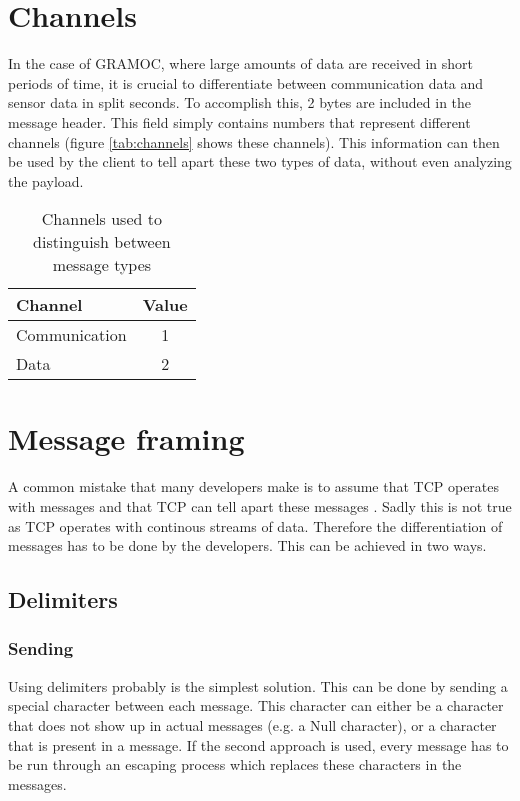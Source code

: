 \section{Channels}
\label{sec:channels}

In the case of GRAMOC, where large amounts of data are received in short periods of time, it is crucial to differentiate between communication data and sensor data in split seconds. To accomplish this, 2 bytes are included in the message header. This field simply contains numbers that represent different channels (figure \vref{tab:channels} shows these channels). This information can then be used by the client to tell apart these two types of data, without even analyzing the payload.

\begin{table}[h]
    \centering
    \begin{tabular}{| l | c |}
    \hline
    \textbf{Channel} & \textbf{Value} \\ \hline
    Communication & 1 \\ \hline
    Data & 2 \\
    \hline
    \end{tabular}
    \caption{Channels used to distinguish between message types}
    \label{tab:channels}
\end{table}

\section{Message framing}
\label{sec:messageframing}

A common mistake that many developers make is to assume that TCP operates with messages and that TCP can tell apart these messages \autocite{MessageFramingCleary} \autocite{MessageFramingSkotzko}. Sadly this is not true as TCP operates with continous streams of data. Therefore the differentiation of messages has to be done by the developers. This can be achieved in two ways.

\subsection{Delimiters}

\subsubsection{Sending}

Using delimiters probably is the simplest solution. This can be done by sending a special character between each message. This character can either be a character that does not show up in actual messages (e.g. a Null character), or a character that is present in a message. If the second approach is used, every message has to be run through an escaping process which replaces these characters in the messages.

